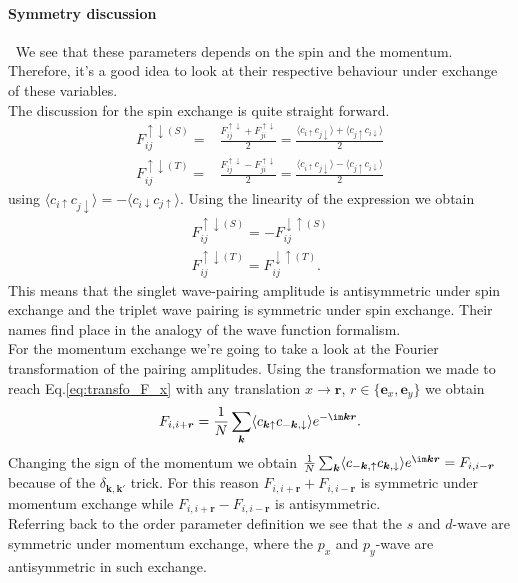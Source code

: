 \documentclass[../main.tex]{subfile}
\begin{document}
\paragraph{Symmetry discussion} $~$ We see that these parameters depends on the spin and the momentum. Therefore, it's a good idea to look at their respective
behaviour under exchange of these variables.\\

The discussion for the spin exchange is quite straight forward.
\begin{align*}
    F_{ij}^{\uparrow\downarrow(S)} =& \frac{F_{ij}^{\uparrow\downarrow} + F_{ji}^{\uparrow\downarrow}}{2} = \frac{\langle c_{i\uparrow}c_{j\downarrow}\rangle + \langle c_{j\uparrow}c_{i\downarrow}\rangle}{2}\\
    F_{ij}^{\uparrow\downarrow(T)} =& \frac{F_{ij}^{\uparrow\downarrow} - F_{ji}^{\uparrow\downarrow}}{2} = \frac{\langle c_{i\uparrow}c_{j\downarrow}\rangle - \langle c_{j\uparrow}c_{i\downarrow}\rangle}{2}
\end{align*}
 using $\langle c_{i\uparrow}c_{j\downarrow}\rangle = -\langle c_{i\downarrow}c_{j\uparrow}\rangle$. Using the linearity of the expression we obtain
\begin{align*}
    F_{ij}^{\uparrow\downarrow(S)} = - F_{ij}^{\downarrow\uparrow(S)}\\
    F_{ij}^{\uparrow\downarrow(T)} = F_{ij}^{\downarrow\uparrow(T)}.
\end{align*}
This means that the singlet wave-pairing amplitude is antisymmetric under spin exchange and the triplet wave pairing is symmetric under spin exchange. Their names
find place in the analogy of the wave function formalism.\\

For the momentum exchange we're going to take a look at the Fourier transformation of the pairing amplitudes. Using the transformation we made to 
reach Eq.\ref{eq:transfo_F_x} with any translation $ x \rightarrow \bm{r}$, $r\in \{\bm{e}_x,\bm{e}_y\}$ we obtain
\begin{align*}
    F_{i,i+ \bm{r}} = \frac{1}{N} \sum_{\bm{k}} \langle c_{\bm{k}\uparrow} c_{-\bm{k},\downarrow}\rangle e^{-\im\bm{k}\bm{r}}.
\end{align*}
Changing the sign of the momentum we obtain  $\frac{1}{N} \sum_{\bm{k}} \langle c_{-\bm{k},\uparrow} c_{\bm{k},\downarrow}\rangle e^{\im\bm{k}\bm{r}} =  F_{i,i- \bm{r}}$
because of the $\delta_{\bm{k},\bm{k}'}$ trick. For this reason $F_{i,i+ \bm{r}} +  F_{i,i- \bm{r}}$ is symmetric under momentum exchange while $F_{i,i+ \bm{r}} -  F_{i,i- \bm{r}}$ is antisymmetric.\\
Referring back to the order parameter definition we see that the $s$ and $d$-wave are symmetric under momentum exchange, where the $p_x$ and $p_y$-wave are antisymmetric in such exchange.\\
\end{document}
